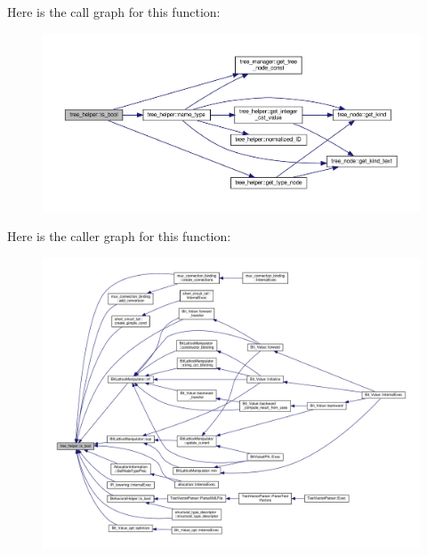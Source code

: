 Here is the call graph for this function\+:
\nopagebreak
\begin{figure}[H]
\begin{center}
\leavevmode
\includegraphics[width=350pt]{d7/d99/classtree__helper_a23c2062c16635d268a1dc97e50928e47_cgraph}
\end{center}
\end{figure}
Here is the caller graph for this function\+:
\nopagebreak
\begin{figure}[H]
\begin{center}
\leavevmode
\includegraphics[width=350pt]{d7/d99/classtree__helper_a23c2062c16635d268a1dc97e50928e47_icgraph}
\end{center}
\end{figure}
\mbox{\label{classtree__helper_af8cf910fccca7d978c710dc49c57ec1c}} 
